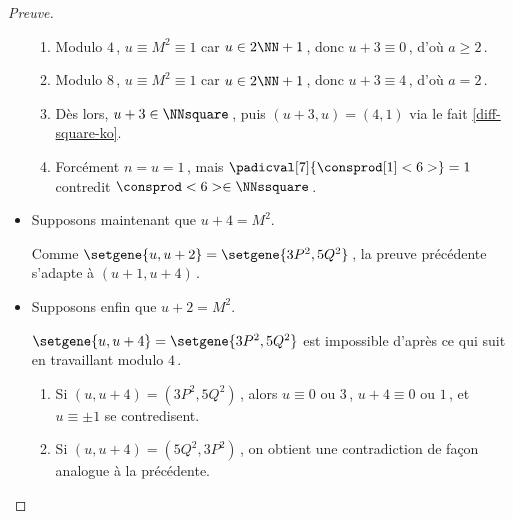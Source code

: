 \begin{proof}[Preuve]
\begin{itemize}
\begin{enumerate}
			\item Modulo $4$\,, $u \equiv M^2 \equiv 1$ car $u \in 2 \NN + 1$\,,
			donc $u + 3 \equiv 0$\,, d'où $a \geq 2$\,.

			\item Modulo $8$\,, $u \equiv M^2 \equiv 1$ car $u \in 2 \NN + 1$\,,
			donc $u + 3 \equiv 4$\,, d'où $a = 2$\,.

			\item Dès lors, $u + 3 \in \NNsquare$\,, puis $(u + 3, u) = (4, 1)$ via le fait \ref{diff-square-ko}.

			\item Forcément $n = u = 1$\,, mais $\padicval[7]{\consprod[1]<6>} = 1$ contredit $\consprod<6> \in \NNssquare$\,.
		\end{enumerate}


    	\item Supposons maintenant que $u + 4 = M^2$.

		\smallskip
		\noindent
		Comme $\setgene{u, u + 2} = \setgene{3P^2, 5Q^2}$\,, la preuve précédente s'adapte à $(u + 1, u + 4)$\,.


    	\item Supposons enfin que $u + 2 = M^2$.

		\smallskip
		\noindent
		$\setgene{u, u + 4} = \setgene{3P^2, 5Q^2}$ est impossible d'après ce qui suit en travaillant modulo $4$\,.
		\begin{enumerate}
			\item Si $(u, u + 4) = (3P^2, 5Q^2)$\,, alors 
			$u \equiv \text{$0$ ou $3$}$\,, 
			$u + 4 \equiv \text{$0$ ou $1$}$\,, et
			$u \equiv \pm 1$
			se contredisent.

			\item Si $(u, u + 4) = (5Q^2, 3P^2)$\,, on obtient une contradiction de façon analogue à la précédente.
		\end{enumerate}
    \end{itemize}
\end{proof}

 
